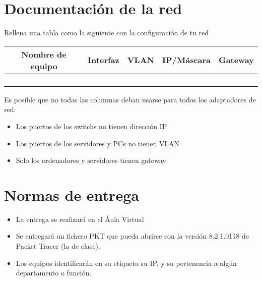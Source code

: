 \section{Documentación de la red}
Rellena una tabla como la siguiente con la configuración de tu red

\begin{center}
  \begin{tabular}{|c|c|c|c|c|}
    \hline
    Nombre de equipo & Interfaz & VLAN & IP/Máscara & Gateway\\
    \hline
                     & & & & \\
                     & & & & \\
                     & & & & \\
                     & & & & \\
    \hline
  \end{tabular}
\end{center}

Es posible que no todas las columnas deban usarse para todos los adaptadores de red:
\begin{itemize}
\item Los puertos de los switchs no tienen dirección IP
\item Los puertos de los servidores y PCs no tienen VLAN
\item Solo los ordenadores y servidores tienen gateway
  
\end{itemize}

\section{Normas de entrega}
\begin{itemize}
  
\item La entrega se realizará en el Áula Virtual
\item Se entregará un fichero PKT que pueda abrirse con la versión 8.2.1.0118 de Packet Tracer (la de clase).
\item Los equipos identificarán en su etiqueta su IP, y su pertenencia a algún departamento o función.
\end{itemize}

